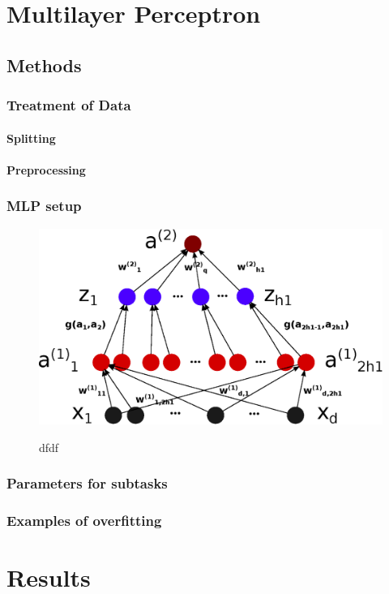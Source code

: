 \section{Multilayer Perceptron}

\subsection{Methods}

\subsubsection{Treatment of Data}

\paragraph{Splitting}

\paragraph{Preprocessing}

\subsubsection{MLP setup}

\begin{figure}
	\centering
	\includegraphics[width=.8\textwidth]{mlp/mlp.eps}
	\label{mlp}
	\caption{dfdf}
\end{figure}
\subsubsection{Parameters for subtasks}

\subsubsection{Examples of overfitting}

\section{Results}